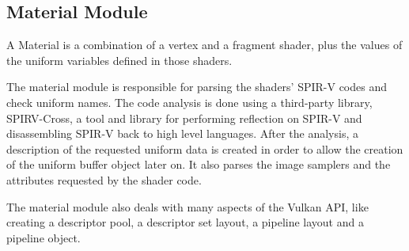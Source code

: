 \subsection{Material Module}
A Material is a combination of a vertex and a fragment shader, plus the values of the uniform variables defined in those shaders.

The material module is responsible for parsing the shaders' SPIR-V codes and check uniform names. The code analysis is done using a third-party library, SPIRV-Cross, a tool and library for performing reflection on SPIR-V and disassembling SPIR-V back to high level languages. After the analysis, a description of the requested uniform data is created in order to allow the creation of the uniform buffer object later on. It also parses the image samplers and the attributes requested by the shader code.

The material module also deals with many aspects of the Vulkan API, like creating a descriptor pool, a descriptor set layout, a pipeline layout and a pipeline object.
